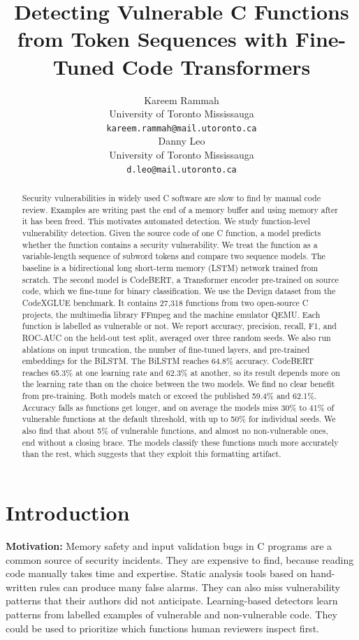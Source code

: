 \documentclass{article}
\title{Detecting Vulnerable C Functions from Token Sequences with Fine-Tuned Code Transformers}
\author{%
  Kareem Rammah \\
  University of Toronto Mississauga \\
  \texttt{kareem.rammah@mail.utoronto.ca} \\
  \And
  Danny Leo \\
  University of Toronto Mississauga \\
  \texttt{d.leo@mail.utoronto.ca} \\
}
\begin{document}
\maketitle

\begin{abstract}
Security vulnerabilities in widely used C software are slow to find by manual code review. Examples are writing past the end of a memory buffer and using memory after it has been freed. This motivates automated detection.
We study function-level vulnerability detection. Given the source code of one C function, a model predicts whether the function contains a security vulnerability.
We treat the function as a variable-length sequence of subword tokens and compare two sequence models.
The baseline is a bidirectional long short-term memory (LSTM) network trained from scratch.
The second model is CodeBERT, a Transformer encoder pre-trained on source code, which we fine-tune for binary classification.
We use the Devign dataset from the CodeXGLUE benchmark. It contains 27{,}318 functions from two open-source C projects, the multimedia library FFmpeg and the machine emulator QEMU. Each function is labelled as vulnerable or not.
We report accuracy, precision, recall, F1, and ROC-AUC on the held-out test split, averaged over three random seeds. We also run ablations on input truncation, the number of fine-tuned layers, and pre-trained embeddings for the BiLSTM.
The BiLSTM reaches 64.8\% accuracy. CodeBERT reaches 65.3\% at one learning rate and 62.3\% at another, so its result depends more on the learning rate than on the choice between the two models. We find no clear benefit from pre-training.
Both models match or exceed the published 59.4\% and 62.1\%.
Accuracy falls as functions get longer, and on average the models miss 30\% to 41\% of vulnerable functions at the default threshold, with up to 50\% for individual seeds.
We also find that about 5\% of vulnerable functions, and almost no non-vulnerable ones, end without a closing brace. The models classify these functions much more accurately than the rest, which suggests that they exploit this formatting artifact.
\end{abstract}

\section{Introduction}

\textbf{Motivation:}
Memory safety and input validation bugs in C programs are a common source of security incidents. They are expensive to find, because reading code manually takes time and expertise.
Static analysis tools based on hand-written rules can produce many false alarms. They can also miss vulnerability patterns that their authors did not anticipate.
Learning-based detectors learn patterns from labelled examples of vulnerable and non-vulnerable code. They could be used to prioritize which functions human reviewers inspect first.
\end{document}
